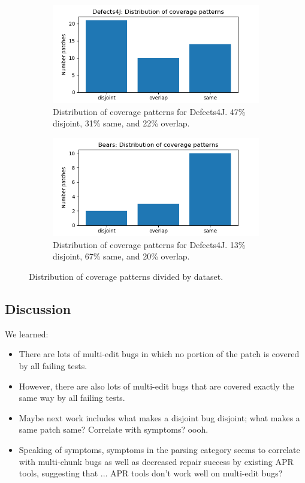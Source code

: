 \begin{figure}
	\begin{subfigure}{\linewidth}
		\includegraphics[width=\linewidth]{img/coverage-d4j.png}
		\caption{Distribution of coverage patterns for Defects4J. 47\% disjoint, 31\% same, and 22\% 
		overlap.}
	\end{subfigure}
	\begin{subfigure}{\linewidth}
		\includegraphics[width=\linewidth]{img/coverage-bears.png}
		\caption{Distribution of coverage patterns for Defects4J. 13\% disjoint, 67\% same, and 20\% 
		overlap.}
	\end{subfigure}
	\caption{Distribution of coverage patterns divided by dataset.}
	\label{fig:coverage-datasets}
\end{figure}




\subsection{Discussion}

We learned:
\begin{itemize}
	\item There are lots of multi-edit bugs in which no portion of the patch is covered by all failing 
	tests.
	\item However, there are also lots of multi-edit bugs that are covered exactly the same way by all 
	failing tests.
	\item Maybe next work includes what makes a disjoint bug disjoint; what makes a same patch 
	same? Correlate with symptoms? oooh.
	\item Speaking of symptoms, symptoms in the parsing category seems to correlate with 
	multi-chunk bugs as well as decreased repair success by existing APR tools, suggesting that ... 
	APR tools don't work well on multi-edit bugs?
\end{itemize}
